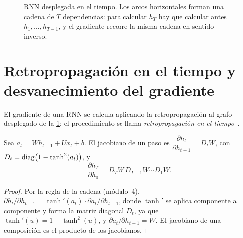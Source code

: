 \begin{figure}[h]
\centering
{}
\caption{RNN desplegada en el tiempo. Los arcos horizontales forman una cadena de $T$ dependencias: para calcular $h_T$ hay que calcular antes $h_1,\dots,h_{T-1}$, y el gradiente recorre la misma cadena en sentido inverso.}
\label{fig:rnn}
\end{figure}

\section{Retropropagación en el tiempo y desvanecimiento del gradiente}

El gradiente de una RNN se calcula aplicando la retropropagación al grafo desplegado de la \cref{fig:rnn}; el procedimiento se llama \emph{retropropagación en el tiempo}~\cite[§9.7]{d2l}.

\begin{lema}\label{lem:jacobiano}
Sea $a_t=W h_{t-1}+U x_t+b$. El jacobiano de un paso es $\dfrac{\partial h_t}{\partial h_{t-1}}=D_t W$, con $D_t=\operatorname{diag}\bigl(1-\tanh^{2}(a_t)\bigr)$, y
\[
\frac{\partial h_T}{\partial h_0}=D_T W\,D_{T-1}W\cdots D_1 W.
\]
\end{lema}

\begin{proof}
Por la regla de la cadena (módulo~4), $\partial h_t/\partial h_{t-1}=\tanh'(a_t)\cdot\partial a_t/\partial h_{t-1}$, donde $\tanh'$ se aplica componente a componente y forma la matriz diagonal $D_t$, ya que $\tanh'(u)=1-\tanh^{2}(u)$, y $\partial a_t/\partial h_{t-1}=W$. El jacobiano de una composición es el producto de los jacobianos.
\end{proof}

